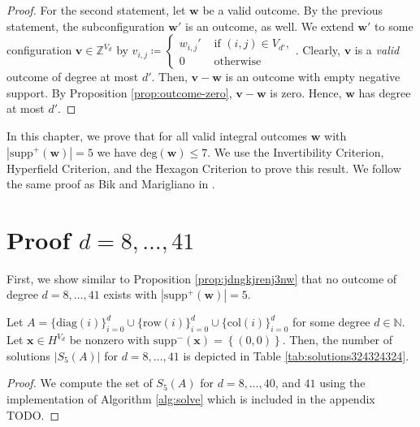 \begin{proof}
    For the second statement, let \( \mathbf{w} \) be a valid outcome. By the previous statement, the subconfiguration \( \mathbf{w}' \) is an outcome, as well. We extend \( \mathbf{w}' \) to some configuration \( \mathbf{v} \in \mathbb{Z}^{V_d} \) by \( v_{i,j} \coloneqq \begin{cases}
        w_{i,j}' & \text{ if } (i,j) \in V_{d'}, \\
        0 & \text{ otherwise}
    \end{cases} \).
    Clearly, \( \mathbf{v} \) is a \emph{valid} outcome of degree at most \( d' \). Then, \( \mathbf{v} - \mathbf{w} \) is an outcome with empty negative support. By Proposition \ref{prop:outcome-zero}, \(  \mathbf{v} - \mathbf{w} \) is zero. Hence, \( \mathbf{w} \) has degree at most \( d' \).
\end{proof}



In this chapter, we prove that for all valid integral outcomes \( \mathbf w \) with \( |\mathrm{supp}^+(\mathbf w)| = 5 \) we have \( \mathrm{deg}(\mathbf w) \leq 7 \).
We use the Invertibility Criterion, Hyperfield Criterion, and the Hexagon Criterion to prove this result. We follow the same proof as Bik and Marigliano in \cite{bik2022classifying}.

\section{Proof \( d = 8, \dots, 41 \)}

First, we show similar to Proposition \ref{prop:jdngkjrenj3nw} that no outcome of degree \( d = 8, \dots, 41 \) exists with \( |\mathrm{supp}^+(\mathbf w)| = 5 \).

\begin{proposition}
    Let $A = \{ \mathrm{diag}(i) \}_{i=0}^d \cup \{ \mathrm{row}(i)\}^d_{i=0} \cup \{ \mathrm{col}(i) \}^d_{i=0}$ for some degree \( d \in \mathbb{N} \). Let \( \mathbf{x} \in H^{V_d} \) be nonzero with \( \mathrm{supp}^-(\mathbf{x}) = \left\{ (0,0) \right\} \). Then, the number of solutions \( \lvert S_5(A) \rvert \) for \( d = 8, \dots, 41 \) is depicted in Table \ref{tab:solutions324324324}.
\end{proposition}

\begin{proof}
    We compute the set of \( S_5(A) \) for \( d = 8, \dots, 40 \), and \( 41 \) using the implementation of Algorithm \ref{alg:solve} which is included in the appendix TODO.
\end{proof}

